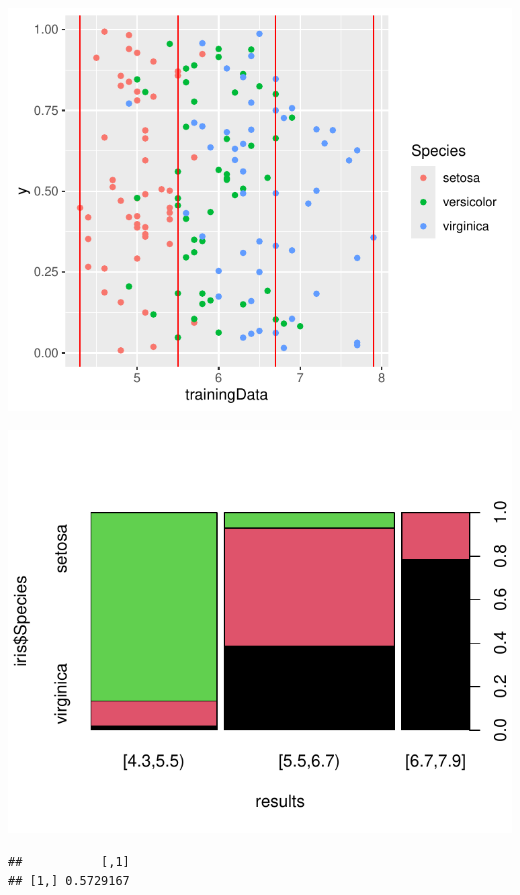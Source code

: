 \documentclass[
  12pt,
]{article}
\begin{document}
\begin{center}\includegraphics{Sprawozdanie2_files/figure-latex/width_najg-2} \end{center}

\begin{center}\includegraphics{Sprawozdanie2_files/figure-latex/tabela_kondygnacji_2_najg-1} \end{center}

\begin{verbatim}
##           [,1]
## [1,] 0.5729167
\end{verbatim}
\end{document}
